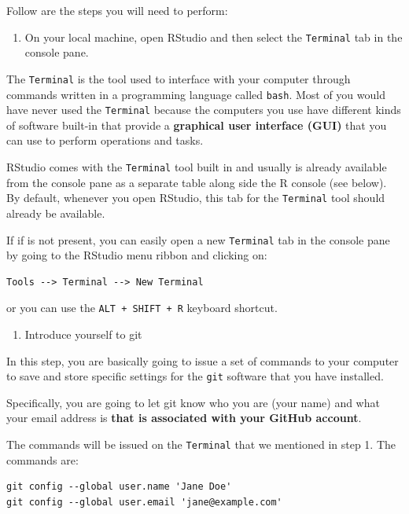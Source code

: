 \documentclass[
  12pt,
]{book}
\providecommand{\tightlist}{%
  \setlength{\itemsep}{0pt}\setlength{\parskip}{0pt}}
\begin{document}
Follow are the steps you will need to perform:

\begin{enumerate}
\def\labelenumi{\arabic{enumi}.}
\tightlist
\item
  On your local machine, open RStudio and then select the \texttt{Terminal} tab in the console pane.
\end{enumerate}

The \texttt{Terminal} is the tool used to interface with your computer through commands written in a programming language called \texttt{bash}. Most of you would have never used the \texttt{Terminal} because the computers you use have different kinds of software built-in that provide a \textbf{graphical user interface (GUI)} that you can use to perform operations and tasks.

RStudio comes with the \texttt{Terminal} tool built in and usually is already available from the console pane as a separate table along side the R console (see below). By default, whenever you open RStudio, this tab for the \texttt{Terminal} tool should already be available.

If if is not present, you can easily open a new \texttt{Terminal} tab in the console pane by going to the RStudio menu ribbon and clicking on:

\begin{verbatim}
Tools --> Terminal --> New Terminal
\end{verbatim}

or you can use the \texttt{ALT\ +\ SHIFT\ +\ R} keyboard shortcut.

\begin{enumerate}
\def\labelenumi{\arabic{enumi}.}
\setcounter{enumi}{1}
\tightlist
\item
  Introduce yourself to git
\end{enumerate}

In this step, you are basically going to issue a set of commands to your computer to save and store specific settings for the \texttt{git} software that you have installed.

Specifically, you are going to let git know who you are (your name) and what your email address is \textbf{that is associated with your GitHub account}.

The commands will be issued on the \texttt{Terminal} that we mentioned in step 1. The commands are:

\begin{verbatim}
git config --global user.name 'Jane Doe'
git config --global user.email 'jane@example.com'
\end{verbatim}
\end{document}
